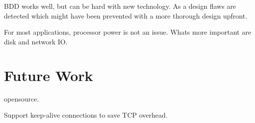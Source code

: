
BDD works well, but can be hard with new technology. As a design flaws are
detected which might have been prevented with a more thorough design upfront.

For most applications, processor power is not an issue. Whats more important
are disk and network IO.

\section{Future Work}

opensource.

Support keep-alive connections to save TCP overhead.
